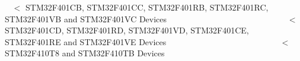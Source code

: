 ~\newline
 $<$ S\+T\+M32\+F401\+CB, S\+T\+M32\+F401\+CC, S\+T\+M32\+F401\+RB, S\+T\+M32\+F401\+RC, S\+T\+M32\+F401\+VB and S\+T\+M32\+F401\+VC Devices ~\newline
~\newline
~\newline
~\newline
~\newline
~\newline
~\newline
~\newline
~\newline
~\newline
~\newline
~\newline
~\newline
~\newline
~\newline
~\newline
~\newline
 $<$ S\+T\+M32\+F401\+CD, S\+T\+M32\+F401\+RD, S\+T\+M32\+F401\+VD, S\+T\+M32\+F401\+CE, S\+T\+M32\+F401\+RE and S\+T\+M32\+F401\+VE Devices ~\newline
~\newline
~\newline
~\newline
~\newline
~\newline
~\newline
~\newline
~\newline
~\newline
~\newline
~\newline
~\newline
~\newline
~\newline
~\newline
 $<$ S\+T\+M32\+F410\+T8 and S\+T\+M32\+F410\+TB Devices ~\newline
~\newline
~\newline
~\newline
~\newline
~\newline
~\newline
~\newline
~\newline
~\newline
~\newline
~\newline
